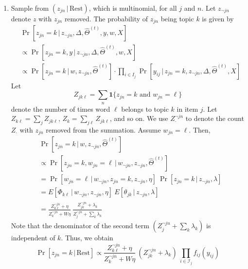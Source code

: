 \begin{enumerate}
\item Sample from $(z_{jn} \,|\, \textrm{Rest})$, which is multinomial, for all $j$ and $n$. Let $z_{\neg jn}$ denote $z$ with $z_{jn}$ removed. The probability of $z_{jn}$ being topic $k$ is given by
\begin{equation*}
\begin{split}
&\Pr[z_{jn} = k \,|\, z_{\neg jn}, \Delta, \hat{\Theta}^{(t)}, y, w, X] \\
&\propto \Pr[z_{jn} = k, y \,|\, z_{\neg jn}, \Delta, \hat{\Theta}^{(t)}, w, X] \\
&\propto \Pr[z_{jn} = k \,|\, w, z_{\neg jn}, \hat{\Theta}^{(t)}] \cdot 
  		  \prod_{i\in I_j} \Pr[y_{ij}\,|\,z_{jn} = k, z_{\neg jn}, 
								   \Delta, \hat{\Theta}^{(t)}, X]
\end{split}
\end{equation*}
Let
$$
Z_{jk\ell} = \sum_n \mathbf{1}\{z_{jn} = k \mbox{ and } w_{jn} = \ell\}
$$
denote the number of times word $\ell$ belongs to topic $k$ in item $j$. Let $Z_{k\ell} = \sum_j Z_{jk\ell}$, $Z_{k} = \sum_{j\ell} Z_{jk\ell}$, and so on. We use $Z_{\cdot}^{\neg jn}$ to denote the count $Z_{\cdot}$ with $z_{jn}$ removed from the summation. Assume $w_{jn} = \ell$. Then,
\begin{equation*}
\begin{split}
& \Pr[z_{jn} = k \,|\, w, z_{\neg jn}, \hat{\Theta}^{(t)}] \\
&	\propto \Pr[z_{jn} = k, w_{jn} = \ell \,|\, 
					w_{\neg jn}, z_{\neg jn}, \hat{\Theta}^{(t)}] \\
&	= \Pr[w_{jn} = \ell \,|\, 
			w_{\neg jn}, z_{jn} = k, z_{\neg jn}, \eta] ~
	  \Pr[z_{jn} = k \,|\, z_{\neg jn}, \lambda] \\
&	= E[ \Phi_{k\ell} \,|\, w_{\neg jn}, z_{\neg jn}, \eta] ~
	  E[ \theta_{jk} \,|\, z_{\neg jn}, \lambda] \\
& 	= \frac{Z_{k\ell}^{\neg jn} + \eta}
			 {Z_{k}^{\neg jn} + W \eta}~
	  \frac{Z_{jk}^{\neg jn} + \lambda_k}
			 {Z_{j}^{\neg jn} + \sum_k \lambda_k}
\end{split}
\end{equation*}
Note that the denominator of the second term $(Z_{j}^{\neg jn} + \sum_k \lambda_k)$ is independent of $k$. Thus, we obtain
\begin{equation}
\Pr[z_{jn} = k \,|\, \mbox{Rest}]
 \propto \frac{Z_{k\ell}^{\neg jn} + \eta}
			 {Z_{k}^{\neg jn} + W \eta} ~ 
			 (Z_{jk}^{\neg jn} + \lambda_k) ~
			 \prod_{i\in \mathcal{I}_j} f_{ij}(y_{ij})
\end{equation}

\end{enumerate}
